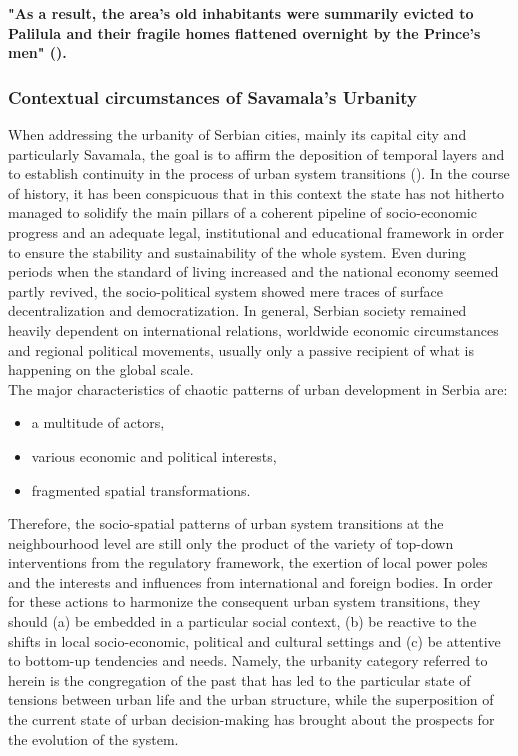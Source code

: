 \documentclass[11pt]{report}
\begin{document}
\textbf{"As a result, the area's old inhabitants were summarily evicted to Palilula  and their fragile homes flattened overnight by the Prince's men" (\href{Krusche}{\citealt{krusche_bureau_2015}}).}

\subsubsection{Contextual circumstances of Savamala's Urbanity}

When addressing the urbanity of Serbian cities, mainly its capital city and particularly Savamala, the goal is to affirm the deposition of temporal layers and to establish continuity in the process of urban system transitions (\href{Grozdanic}{\citealt{grozdanic_belgrade_2008}}).
In the course of history, it has been conspicuous that in this context the state has not hitherto managed to solidify the main pillars of a coherent pipeline of socio-economic progress and an adequate legal, institutional and educational framework in order to ensure the stability and sustainability of the whole system. Even during periods when the standard of living increased and the national economy seemed partly revived, the socio-political system showed mere traces of surface decentralization and democratization. In general, Serbian society remained heavily dependent on international relations, worldwide economic circumstances and regional political movements, usually only a passive recipient of what is happening on the global scale.
\\

The major characteristics of chaotic patterns of urban development in Serbia are:
\begin{itemize}
\item a multitude of actors,
\item various economic and political interests,
\item fragmented spatial transformations.
\end{itemize}

Therefore, the socio-spatial patterns of urban system transitions at the neighbourhood level are still only the product of the variety of top-down interventions from the regulatory framework, the exertion of local power poles and the interests and influences from international and foreign bodies. In order for these actions to harmonize the consequent urban system transitions, they should (a) be embedded in a particular social context, (b) be reactive to the shifts in local socio-economic, political and cultural settings and (c) be attentive to bottom-up tendencies and needs. Namely, the urbanity category referred to herein is the congregation of the past that has led to the particular state of tensions between urban life and the urban structure,
while the superposition of the current state of urban decision-making has brought about the prospects for the evolution of the system. 
\end{document}
